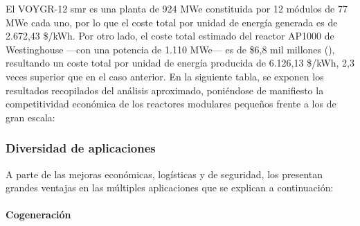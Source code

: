   El VOYGR-12 \acrshort{smr} es una planta de 924 MWe constituida por 12 módulos de 77 MWe cada uno, por lo que el coste total por unidad de energía generada es de 2.672,43 \$/kWh. Por otro lado, el coste total estimado del reactor AP1000 de Westinghouse ---con una potencia de 1.110 MWe--- es de \$6,8 mil millones (\cite{cost_ap1000}), resultando un coste total por unidad de energía producida de 6.126,13 \$/kWh, 2,3 veces superior que en el caso anterior. En la siguiente tabla, se exponen los resultados recopilados del análisis aproximado, poniéndose de manifiesto la competitividad económica de los reactores modulares pequeños frente a los de gran escala:

  \begin{table}[h]
    \centering
    \caption{Comparación de costes entre una central nuclear de gran escala de generación III+ y un SMR en fase avanzada de desarrollo (\cite{cost_ap1000} y \cite{cost_evaluation_nuscale}).}
    \label{tab:comparacion_voygr_ap1000}
    \end{table}

\newpage

\subsubsection{Diversidad de aplicaciones}

A parte de las mejoras económicas, logísticas y de seguridad, los  presentan grandes ventajas en las múltiples aplicaciones que se explican a continuación:

\paragraph{Cogeneración} \label{cogeneracion}

